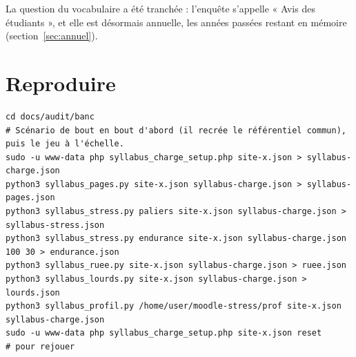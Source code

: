 \documentclass[11pt,a4paper]{article}
\begin{document}
La question du vocabulaire a été tranchée : l'enquête s'appelle « Avis des étudiants », et elle
est désormais annuelle, les années passées restant en mémoire (section~\ref{sec:annuel}).

\section{Reproduire}

{\small
\begin{verbatim}
cd docs/audit/banc
# Scénario de bout en bout d'abord (il recrée le référentiel commun), puis le jeu à l'échelle.
sudo -u www-data php syllabus_charge_setup.php site-x.json > syllabus-charge.json
python3 syllabus_pages.py site-x.json syllabus-charge.json > syllabus-pages.json
python3 syllabus_stress.py paliers site-x.json syllabus-charge.json > syllabus-stress.json
python3 syllabus_stress.py endurance site-x.json syllabus-charge.json 100 30 > endurance.json
python3 syllabus_ruee.py site-x.json syllabus-charge.json > ruee.json
python3 syllabus_lourds.py site-x.json syllabus-charge.json > lourds.json
python3 syllabus_profil.py /home/user/moodle-stress/prof site-x.json syllabus-charge.json
sudo -u www-data php syllabus_charge_setup.php site-x.json reset      # pour rejouer
\end{verbatim}
}
\end{document}
